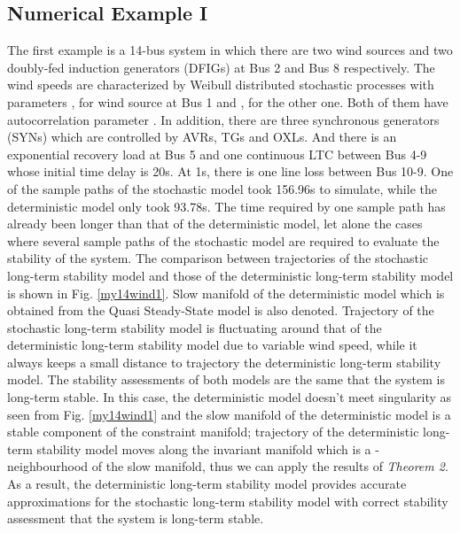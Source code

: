 \documentclass[journal]{IEEEtran}
\begin{document}
\subsection{Numerical Example I}
The first example is a 14-bus system in which there are two wind sources and two doubly-fed induction generators (DFIGs) at Bus 2 and Bus 8 respectively. The wind speeds are characterized by Weibull distributed stochastic processes with parameters ,  for wind source at Bus 1 and ,  for the other one. Both of them have autocorrelation parameter \cite{Milano:2013_1}. In addition, there are three synchronous generators (SYNs) which are controlled by AVRs, TGs and OXLs. And there is an exponential recovery load at Bus 5 and one continuous LTC between Bus 4-9 whose initial time delay is 20s. At 1s, there is one line loss between Bus 10-9. 
One of the sample paths of the stochastic model took 156.96s to simulate, while the deterministic model only took 93.78s. The time required by one sample path has already been longer than that of the deterministic model, let alone the cases where several sample paths of the stochastic model are required to evaluate the stability of the system. The comparison between trajectories of the stochastic long-term stability model and those of the deterministic long-term stability model is shown in Fig. \ref{my14wind1}. Slow manifold of the deterministic model which is obtained from the Quasi Steady-State model \cite{Cutsem:book} is also denoted. Trajectory of the stochastic long-term stability model is fluctuating around that of the deterministic long-term stability model due to variable wind speed, while it always keeps a small distance to trajectory the deterministic long-term stability model. The stability assessments of both models are the same that the system is long-term stable. In this case, the deterministic model doesn't meet singularity as seen from Fig. \ref{my14wind1} and the slow manifold of the deterministic model is a stable component of the constraint manifold; trajectory of the deterministic long-term stability model moves along the invariant manifold  which is a -neighbourhood of the slow manifold, thus we can apply the results of \textit{Theorem 2}.  As a result, the deterministic long-term stability model provides accurate approximations for the stochastic long-term stability model with correct stability assessment that the system is long-term stable.
\end{document}

